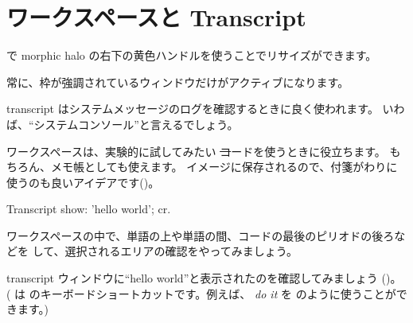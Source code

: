 \documentclass[a4paper,10pt,twoside]{book}
\begin{document}
\section{ワークスペースと Transcript}


\metaclick で morphic halo の右下の黄色ハンドルを使うことでリサイズができます。

常に、枠が強調されているウィンドウだけがアクティブになります。

transcript はシステムメッセージのログを確認するときに良く使われます。
いわば、``システムコンソール''と言えるでしょう。

ワークスペースは、実験的に試してみたい \st コードを使うときに役立ちます。
もちろん、メモ帳としても使えます。
イメージに保存されるので、付箋がわりに使うのも良いアイデアです()。

\begin{code}{}
Transcript show: 'hello world'; cr.
\end{code}

ワークスペースの中で、単語の上や単語の間、コードの最後のピリオドの後ろなどを \click して、選択されるエリアの確認をやってみましょう。

transcript ウィンドウに``hello world''と表示されたのを確認してみましょう
()。
( は  のキーボードショートカットです。例えば、 \emph{do it} を  のように使うことができます。)
\end{document}
